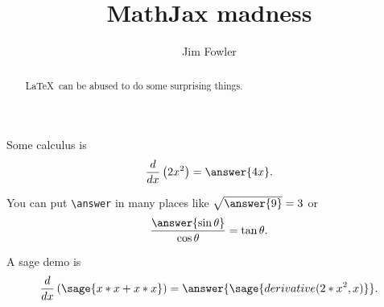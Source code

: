 \documentclass{ximera}
\title{MathJax madness}
\author{Jim Fowler}
\begin{document}
\begin{abstract}
  \LaTeX\ can be abused to do some surprising things.
\end{abstract}

\maketitle

\begin{problem}
  Some calculus is
  \[
    \frac{d}{dx} \left( 2x^2 \right) = \answer{4x}.
  \]

  You can put \verb|\answer| in many places
    like \(\sqrt{\answer{9}} = 3\)
    or \[
      \frac{\answer{\sin \theta}}{\cos \theta} = \tan \theta.
    \]
\end{problem}

\begin{problem}
  A sage demo is
  \[
    \frac{d}{dx} \left( \sage{x*x + x*x} \right) =
      \answer{\sage{derivative(2*x^2,x)}}.
  \]
\end{problem}
\end{document}
